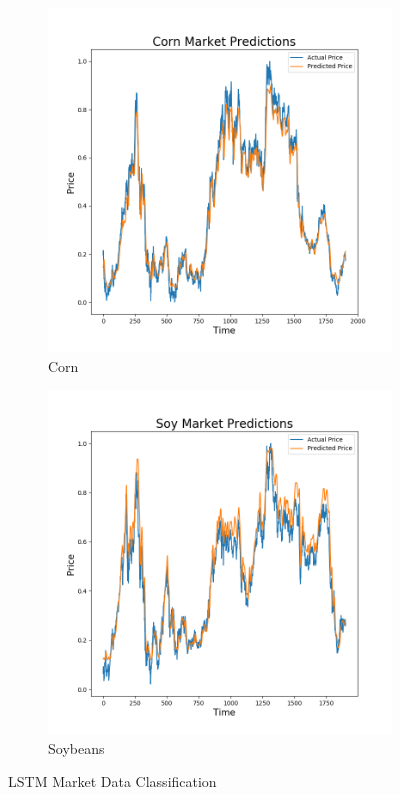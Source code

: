 \documentclass{article}
\begin{document}
\vfill

\begin{figure}[H]
\centering
\begin{subfigure}{.5\textwidth}
  \centering
  \includegraphics[scale=.38]{images/CornMarket}
\caption{Corn}
\end{subfigure}%
\begin{subfigure}{.5\textwidth}
  \centering
  \includegraphics[scale=.38]{images/SoyMarket}
\caption{Soybeans}
\end{subfigure}
\caption{LSTM Market Data Classification}
\end{figure}
\end{document}
